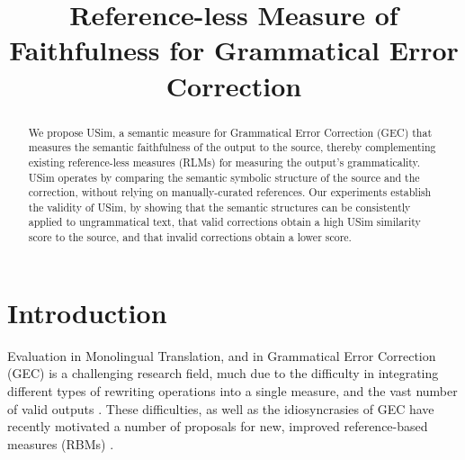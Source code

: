 \documentclass[a4paper, 11pt]{article}
\begin{document}
\title{Reference-less Measure of Faithfulness for Grammatical Error Correction}
\maketitle

\begin{abstract}
  We propose {\sc USim}, a semantic measure for Grammatical Error Correction (GEC)
  that measures the semantic faithfulness of the output to the source,
  thereby complementing existing reference-less measures (RLMs) for measuring the output's grammaticality.
  {\sc USim} operates by comparing the semantic symbolic structure of the source and the correction,
	without relying on manually-curated references.
  Our experiments establish the validity of {\sc USim},
  by showing that the semantic structures can be consistently applied to ungrammatical text, that
  valid corrections obtain a high {\sc USim} similarity score to the source, and that
  invalid corrections obtain a lower score. 
\end{abstract}


\section{Introduction}

Evaluation in Monolingual Translation, and in Grammatical Error Correction (GEC) is a challenging
research field, much due to the difficulty in integrating 
different types of rewriting operations into a single measure, and the vast number of valid outputs
\cite{tetreault2008native,madnani2011they,chodorow2012problems,bryant2015far}.
These difficulties, as well as the idiosyncrasies of GEC have recently motivated
a number of proposals for new, improved reference-based measures (RBMs)  \cite{dahlmeier2012better,felice2015towards,napoles2015ground}.
\end{document}
